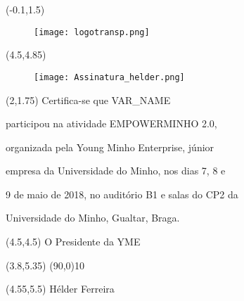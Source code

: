 \documentclass{article}
\begin{document}
\begin{textblock}{10}(-0.1,1.5)
\begin{figure}
    \texttt{[image: logotransp.png]}
\end{figure}
\end{textblock}

\begin{textblock}{20}(4.5,4.85)
\begin{figure}
    \texttt{[image: Assinatura\_helder.png]}
\end{figure}
\end{textblock}



\begin{textblock}{7}(2,1.75)
\LARGE \center
   Certifica-se que VAR_NAME

   participou na atividade EMPOWERMINHO 2.0,

   organizada pela Young Minho Enterprise, júnior

   empresa da Universidade do Minho, nos dias 7, 8 e
   
   9 de maio de 2018, no auditório B1 e salas do CP2 da
   
   Universidade do Minho, Gualtar, Braga.
\end{textblock}

\begin{textblock}{2}(4.5,4.5)
O Presidente da YME
\end{textblock}

\begin{textblock}{20}(3.8,5.35)
\line(90,0){10}
\end{textblock}

\begin{textblock}{2}(4.55,5.5)
\huge Hélder Ferreira
\end{textblock}
\end{document}

